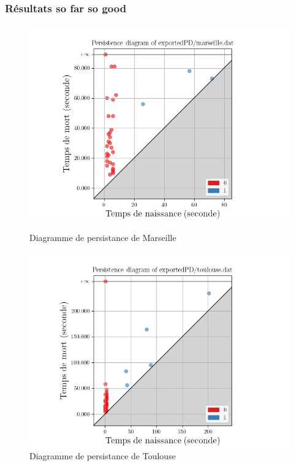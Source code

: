 \documentclass{beamer}
\begin{document}
\begin{frame}
    \frametitle{Résultats so far so good}

    \begin{figure}[h]
        \begin{minipage}[c]{.45\linewidth}
            \centering
            \includegraphics[width=1.2\textwidth]{pd_marseille}
            \caption{Diagramme de persistance de Marseille}
        \end{minipage}
        \hfill
        \begin{minipage}[c]{.45\linewidth}
            \centering
            \includegraphics[width=1.2\textwidth]{pd_toulouse}
            \caption{Diagramme de persistance de Toulouse}
        \end{minipage}
    \end{figure}
\end{frame}
\end{document}
